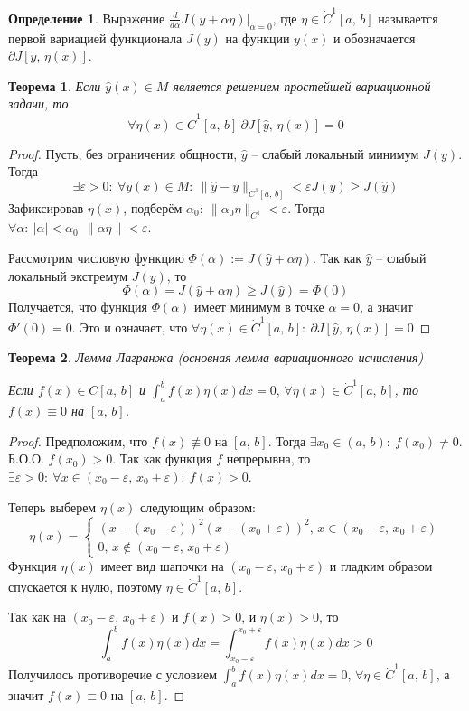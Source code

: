 \documentclass[a4paper,12pt]{article}
\renewcommand{\geq}{\ensuremath{\geqslant}}
\theoremstyle{plain}
\newtheorem{theorem}{Теорема}[section]
\theoremstyle{definition}
\newtheorem{definition}{Определение}[section]
\theoremstyle{remark}
\begin{document}
\begin{definition}
	Выражение $\frac{d}{d\alpha}J(y + \alpha\eta)|_{\alpha = 0}$, где $\eta \in \dot{C}^1[a,\,b]$ называется первой вариацией функционала $J(y)$ на функции $y(x)$ и обозначается $\partial J[y,\,\eta(x)]$.
\end{definition}

\begin{theorem}
	Если $\hat{y}(x) \in M$ является решением простейшей вариационной задачи, то
	\[\forall \eta(x) \in \dot{C}^1[a,\,b] \: \partial J[\hat{y},\, \eta(x)] = 0\]
\end{theorem}

\begin{proof}
	Пусть, без ограничения общности, $\hat{y}$ -- слабый локальный минимум $J(y)$. Тогда
	\[
		\exists \varepsilon > 0:\: \forall y(x) \in M:\: \|\hat{y} - y\|_{C^1[a,\,b]} < \varepsilon J(y) \geq J(\hat{y})
	\]
	Зафиксировав $\eta(x)$, подберём $\alpha_0:\: \|\alpha_0\eta\|_{C^1} < \varepsilon$. Тогда $\forall \alpha:\: |\alpha| < \alpha_0 \:\: \|\alpha\eta\| < \varepsilon$.

	Рассмотрим числовую функцию $\Phi(\alpha) := J(\hat{y} + \alpha\eta)$. Так как $\hat{y}$ -- слабый локальный экстремум $J(y)$, то
	\[\Phi(\alpha) = J(\hat{y} + \alpha\eta) \geq J(\hat{y}) = \Phi(0)\]
	Получается, что функция $\Phi(\alpha)$ имеет минимум в точке $\alpha = 0$, а значит $\Phi'(0) = 0$. Это и означает, что $\forall \eta(x) \in \dot{C}^1[a,\,b] :\: \partial J[\hat{y},\, \eta(x)] = 0$
\end{proof}

\begin{theorem}
	Лемма Лагранжа (основная лемма вариационного исчисления)

	Если $f(x) \in C[a,\,b]$ и $\int_a^b f(x)\eta(x)dx = 0,\, \forall \eta(x) \in \dot{C}^1[a,\,b]$, то $f(x) \equiv 0$ на $[a,\,b]$.
\end{theorem}

\begin{proof}
	Предположим, что $f(x) \not\equiv 0$ на $[a,\,b]$. Тогда $\exists x_0 \in (a,\,b):\: f(x_0) \neq 0$. Б.О.О. $f(x_0) > 0$. Так как функция $f$ непрерывна, то $\exists \varepsilon > 0:\: \forall x \in (x_0 - \varepsilon,\, x_0 + \varepsilon) :\: f(x) > 0$.

	Теперь выберем $\eta(x)$ следующим образом:
	\[
		\eta(x) = \begin{cases}
			(x - (x_0 - \varepsilon))^2(x - (x_0 + \varepsilon))^2,\, x \in (x_0 - \varepsilon,\, x_0 + \varepsilon) \\
			0,\, x \not\in (x_0 - \varepsilon,\, x_0 + \varepsilon)
		\end{cases}
	\]
	Функция $\eta(x)$ имеет вид шапочки на $(x_0 - \varepsilon,\, x_0 + \varepsilon)$ и гладким образом спускается к нулю, поэтому $\eta \in \dot{C}^1[a,\,b]$.

	Так как на $(x_0 - \varepsilon,\, x_0 + \varepsilon)$ и $f(x) > 0$, и $\eta(x) > 0$, то
	\[\int_a^b f(x)\eta(x)dx = \int_{x_0 - \varepsilon}^{x_0 + \varepsilon}f(x)\eta(x)dx > 0\]
	Получилось противоречие с условием $\int_a^b f(x)\eta(x)dx = 0,\, \forall \eta \in \dot{C}^1[a,\,b]$, а значит $f(x) \equiv 0$ на $[a,\,b]$.
\end{proof}
\end{document}
